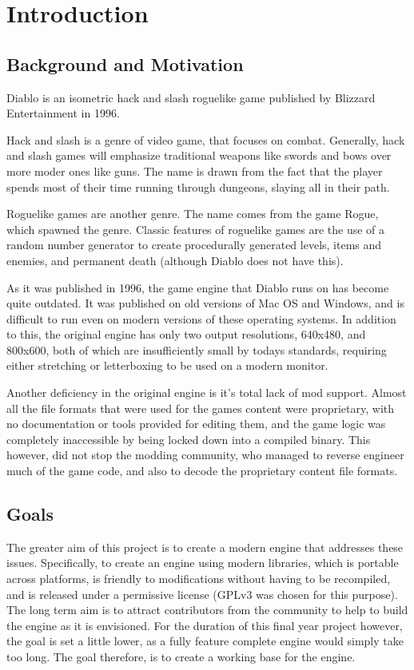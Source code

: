 \chapter{Introduction}
	\section{Background and Motivation}
	Diablo is an isometric hack and slash roguelike game published by Blizzard Entertainment in 1996\cite{diablo}.
	
	Hack and slash is a genre of video game, that focuses on combat. Generally, hack and slash games will emphasize   traditional weapons like swords and bows over more moder ones like guns. The name is drawn from the fact that the player spends most of their time running through dungeons, slaying all in their path.
	
	Roguelike games are another genre. The name comes from the game Rogue\cite{rogue}, which spawned the genre.
	Classic features of roguelike games are the use of a random number generator to create procedurally generated levels, items and enemies, and permanent death (although Diablo does not have this).
	
	As it was published in 1996, the game engine that Diablo runs on has become quite outdated. It was published on old versions of Mac OS and Windows, and is difficult to run even on modern versions of these operating systems.
	In addition to this, the original engine has only two output resolutions, 640x480, and 800x600, both of which are insufficiently small by todays standards, requiring either stretching or letterboxing to be used on a modern monitor.
	
	Another deficiency in the original engine is it's total lack of mod support. Almost all the file formats that were used for the games content were proprietary, with no documentation or tools provided for editing them, and the game logic was completely inaccessible by being locked down into a compiled binary. This however, did not stop the modding community, who managed to reverse engineer much of the game code, and also to decode the proprietary content file formats.

	\section{Goals}	
	The greater aim of this project is to create a modern engine that addresses these issues. Specifically, to create an engine using modern libraries, which is portable across platforms, is friendly to modifications without having to be recompiled, and is released under a permissive license (GPLv3 was chosen for this purpose).
	The long term aim is to attract contributors from the community to help to build the engine as it is envisioned. For the duration of this final year project however, the goal is set a little lower, as a fully feature complete engine would simply take too long. The goal therefore, is to create a working base for the engine.
	
